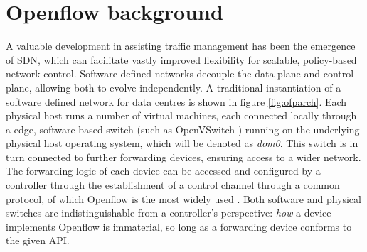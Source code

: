 \section{Openflow background}
\label{section:inflex:background}

A valuable development in assisting traffic management has been the emergence of \ac{SDN}, which can facilitate vastly improved flexibility for scalable, policy-based network control.
Software defined networks decouple the data plane and control plane, allowing both to evolve independently.
A traditional instantiation of a software defined network for data centres is shown in figure \ref{fig:ofparch}.
Each physical host runs a number of virtual machines, each connected locally through a edge, software-based switch (such as OpenVSwitch \cite{openvswitch}) running on the underlying physical host operating system, which will be denoted as \emph{dom0}.
This switch is in turn connected to further forwarding devices, ensuring access to a wider network.
The forwarding logic of each device can be accessed and configured by a controller through the establishment of a control channel through a common protocol, of which Openflow is the most widely used \cite{McKeown:2008:OEI:1355734.1355746}.
Both software and physical switches are indistinguishable from a controller's perspective: \emph{how} a device implements Openflow is immaterial, so long as a forwarding device conforms to the given \ac{API}.

